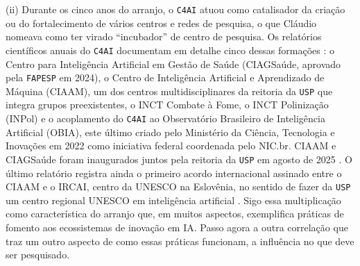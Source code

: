 (ii) Durante os cinco anos do arranjo, o \texttt{C4AI} atuou como catalisador da criação ou do fortalecimento de vários centros e redes de pesquisa, o que Cláudio nomeava como ter virado \enquote{incubador} de centro de pesquisa. Os relatórios científicos anuais do \texttt{C4AI} documentam em detalhe cinco dessas formações \parencite{C4AI2024, C4AI2025}: o Centro para Inteligência Artificial em Gestão de Saúde (CIAGSaúde, aprovado pela \texttt{FAPESP} em 2024), o Centro de Inteligência Artificial e Aprendizado de Máquina (CIAAM), um dos centros multidisciplinares da reitoria da \texttt{USP} que integra grupos preexistentes, o INCT Combate à Fome, o INCT Polinização (INPol) e o acoplamento do \texttt{C4AI} ao Observatório Brasileiro de Inteligência Artificial (OBIA), este último criado pelo Ministério da Ciência, Tecnologia e Inovações em 2022 como iniciativa federal coordenada pelo NIC.br. CIAAM e CIAGSaúde foram inaugurados juntos pela reitoria da \texttt{USP} em agosto de 2025 \parencite{JornalUSP2025CIAAM}. O último relatório registra ainda o primeiro acordo internacional assinado entre o CIAAM e o IRCAI, centro da UNESCO na Eslovênia, no sentido de fazer da \texttt{USP} um centro regional UNESCO em inteligência artificial \parencite{C4AI2025}. Sigo essa multiplicação como característica do arranjo que, em muitos aspectos, exemplifica práticas de fomento aos ecossistemas de inovação em IA. Passo agora a outra correlação que traz um outro aspecto de como essas práticas funcionam, a influência no que deve ser pesquisado.

